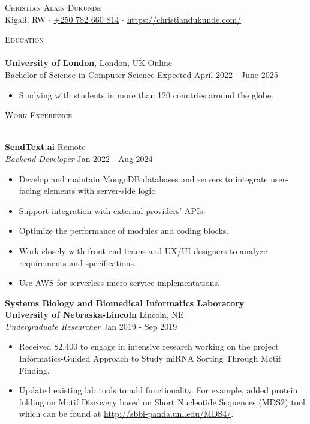 \documentclass[a4paper]{article}
\newcommand{\lineunder} {
    \vspace*{-8pt} \\
    \hspace*{-18pt} \hrulefill \\
}
\newcommand{\header} [1] {
    {\hspace*{-18pt}\vspace*{6pt} \textsc{#1}}
    \vspace*{-6pt} \lineunder
}
\begin{document}
\vspace*{-40pt}

\vspace*{-10pt}
\begin{center}
	{\Huge \scshape {Christian Alain Dukunde}}\\
	Kigali, RW $\cdot$ \href{tel:+250782660814}{+250 782 660 814} $\cdot$ \url{https://christiandukunde.com/}\\
\end{center}

\header{Education}
\textbf{University of London}, London, UK Online\\
Bachelor of Science in Computer Science \hfill Expected April 2022 - June 2025\\
\begin{itemize} \itemsep 1pt
	\item Studying with students in more than 120 countries around the globe.
\end{itemize}
\vspace{2mm}

\header{Work Experience}
\vspace{1mm}

\textbf{SendText.ai} \hfill Remote\\
\textit{Backend Developer} \hfill Jan 2022 - Aug 2024\\
\vspace{-1mm}
\begin{itemize} \itemsep 1pt
	\item Develop and maintain MongoDB databases and servers to integrate user-facing elements with server-side logic.
	\item Support integration with external providers’ APIs.
	\item Optimize the performance of modules and coding blocks.
	\item Work closely with front-end teams and UX/UI designers to analyze requirements and specifications.
	\item Use AWS for serverless micro-service implementations.
\end{itemize}

\textbf{Systems Biology and Biomedical Informatics Laboratory\\ University of Nebraska-Lincoln} \hfill Lincoln, NE\\
\textit{Undergraduate Researcher} \hfill Jan 2019 - Sep 2019\\
\vspace{-1mm}
\begin{itemize} \itemsep 1pt
	\item Received \$2,400 to engage in intensive research working on the project \textquotedbl{}Informatics-Guided Approach to Study miRNA Sorting Through Motif Finding\textquotedbl{}.
	\item Updated existing lab tools to add functionality. For example, added protein folding on Motif Discovery based on Short Nucleotide Sequences (MDS2) tool which can be found at \url{http://sbbi-panda.unl.edu/MDS4/}.
\end{itemize}
\end{document}
